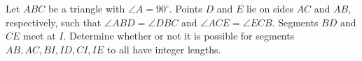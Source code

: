 Let $ABC$ be a triangle with $\angle{A}=90^\circ$. Points $D$ and $E$ lie on sides $AC$ and $AB$, respectively, such that $\angle{ABD}=\angle{DBC}$ and $\angle{ACE}=\angle{ECB}$. Segments $BD$ and $CE$ meet at $I$. Determine whether or not it is possible for segments $AB,AC,BI,ID,CI,IE$ to all have integer lengths.